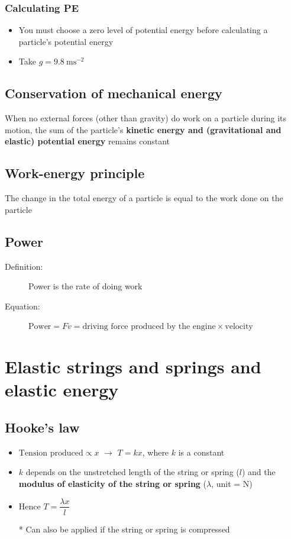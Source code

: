 \documentclass[11pt, A4paper]{article}
\begin{document}
	\subsubsection{Calculating PE}
	\begin{itemize}
		\item You must choose a zero level of potential energy before calculating a particle's potential energy
		\item Take $g=9.8 \: \text{ms}^{-2}$
	\end{itemize}
	
	
	\subsection{Conservation of mechanical energy}
	When no external forces (other than gravity) do work on a particle during its motion, the sum of the particle's \textbf{kinetic energy and (gravitational and elastic) potential energy} remains constant
	
	\subsection{Work-energy principle}
	The change in the total energy of a particle is equal to the work done on the particle
	
	\subsection{Power}
	\begin{description}
		\item[Definition:] Power is the rate of doing work
		\item[Equation:] $\text{Power}=Fv=\text{driving force produced by the engine}\times\text{velocity}$
	\end{description}
	
	\section[3 Elastic strings and springs and elastic energy]{Elastic strings and springs and elastic energy}
	\subsection{Hooke's law}
	\begin{itemize}
		\item $\text{Tension produced}\propto x$ $\rightarrow$ $T=kx$, where $k$ is a constant
		\item $k$ depends on the unstretched length of the string or spring ($l$) and the \textbf{modulus of elasticity of the string or spring} ($\lambda$, unit = N)
		\item Hence $T=\dfrac{\lambda x}{l}$
		\item[*] Can also be applied if the string or spring is compressed
	\end{itemize}
	
\end{document}
